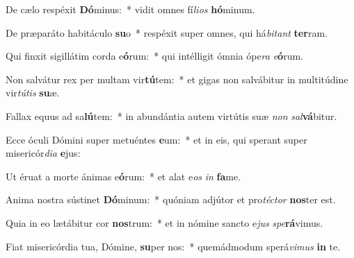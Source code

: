 \item De cælo respéxit \textbf{Dó}minus:~* vidit omnes fí\textit{li}\textit{os} \textbf{hó}minum.
\item De præparáto habitáculo \textbf{su}o~* respéxit super omnes, qui há\textit{bi}\textit{tant} \textbf{ter}ram.
\item Qui finxit sigillátim corda e\textbf{ó}rum:~* qui intélligit ómnia ópe\textit{ra} \textit{e}\textbf{ó}rum.
\item Non salvátur rex per multam vir\textbf{tú}tem:~* et gigas non salvábitur in multitúdine vir\textit{tú}\textit{tis} \textbf{su}æ.
\item Fallax equus ad sa\textbf{lú}tem:~* in abundántia autem virtútis suæ \textit{non} \textit{sal}\textbf{vá}bitur.
\item Ecce óculi Dómini super metuéntes \textbf{e}um:~* et in eis, qui sperant super misericór\textit{di}\textit{a} \textbf{e}jus:
\item Ut éruat a morte ánimas e\textbf{ó}rum:~* et alat e\textit{os} \textit{in} \textbf{fa}me.
\item Anima nostra sústinet \textbf{Dó}minum:~* quóniam adjútor et pro\textit{téc}\textit{tor} \textbf{nos}ter est.
\item Quia in eo lætábitur cor \textbf{nos}trum:~* et in nómine sancto e\textit{jus} \textit{spe}\textbf{rá}vimus.
\item Fiat misericórdia tua, Dómine, \textbf{su}per nos:~* quemádmodum sperá\textit{vi}\textit{mus} \textbf{in} te.
